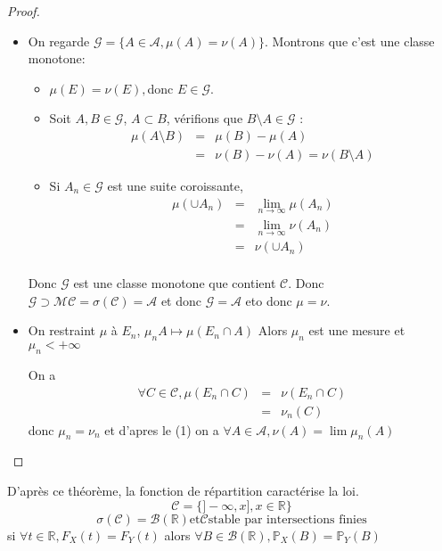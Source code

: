 \begin{proof}
	\begin{itemize}
		\item On regarde $\mathscr{G} = \{A \in \mathscr{A}, \mu(A) = \nu(A)\}$. Montrons que c'est une classe monotone:
		      \begin{itemize}
			      \item $\mu (E) = \nu (E), $donc $E\in \mathscr{G}$.
			      \item Soit $A,B \in \mathscr{G}$, $A\subset B $, vérifions que $B\setminus A \in \mathscr{G}$ :
			            \begin{eqnarray*}
				            \mu(A \setminus B ) &=& \mu(B)- \mu(A) \\
				            &=& \nu (B) - \nu(A) = \nu (B\setminus A)
			            \end{eqnarray*}
			      \item Si $A_n \in \mathscr{G}$ est une suite coroissante,
			            \begin{eqnarray*}
				            \mu(\cup A_n) &=& \lim\limits_{n \to \infty} \mu(A_n) \\
				            &=& \lim\limits_{n \to \infty} \nu(A_n) \\
				            &=& \nu(\cup A_n) \\
			            \end{eqnarray*}
		      \end{itemize}
		      Donc $\mathscr{G}$ est une classe monotone que contient $\mathscr{C}$.
		      Donc $\mathscr{G} \supset\mathscr{M}\mathscr{C} = \sigma(\mathscr{C}) = \mathscr{A}$ et
		      donc $\mathscr{G} = \mathscr{A}$ eto donc $\mu = \nu$.
		\item
		      On restraint $\mu$ à $E_n$, $\mu_n A \mapsto \mu(E_n \cap A)$
		      Alors $\mu_n$ est une mesure et $\mu_n < +\infty$

		      On a
		      \begin{eqnarray*}
			      \forall C \in \mathscr{C}, \mu (E_n \cap C) &=& \nu (E_n \cap C) \\
			      &=& \nu_n(C)
		      \end{eqnarray*}
		      donc $\mu_n = \nu_n$ et d'apres le (1) on a $\forall A \in \mathscr{A}, \nu(A) = \lim \mu_n(A)$
	\end{itemize}
\end{proof}


\begin{remarque}
	D'après ce théorème, la fonction de répartition caractérise la loi.
	$$ \mathscr{C} = \{ ]-\infty, x], x \in \mathbb{R} \} $$
	$$ \sigma(\mathscr{C}) = \mathscr{B}(\mathbb{R}) \text{et} \mathscr{C} \text{stable par intersections finies}$$
	si $\forall t \in \mathbb{R}, F_X(t) = F_Y(t)$ alors $\forall B \in \mathscr{B}(\mathbb{R}), \mathbb{P}_X(B) = \mathbb{P}_Y(B)$
\end{remarque}

